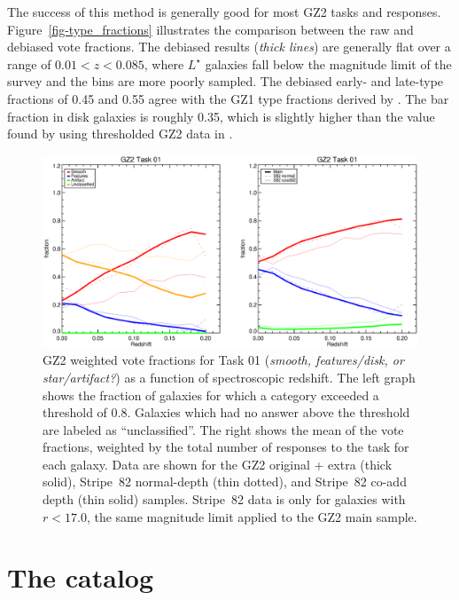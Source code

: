 \documentclass[useAMS,usenatbib]{mn2e}
\begin{document}
The success of this method is generally good for most GZ2 tasks and responses. Figure~\ref{fig-type_fractions} illustrates the comparison between the raw and debiased vote fractions. The debiased results ({\it thick lines}) are generally flat over a range of $0.01<z<0.085$, where $L^\star$ galaxies fall below the magnitude limit of the survey and the bins are more poorly sampled. The debiased early- and late-type fractions of 0.45 and 0.55 agree with the GZ1 type fractions derived by \citet{bam09}. The bar fraction in disk galaxies is roughly 0.35, which is slightly higher than the value found by using thresholded GZ2 data in \citet{mas11c}.

\begin{figure}
\includegraphics[angle=0,width=7.0in]{figures/gz2_bias_demo_task01.ps}
\caption{GZ2 weighted vote fractions for Task 01 ({\it smooth, features/disk, or star/artifact?}) as a function of spectroscopic redshift. The left graph shows the fraction of galaxies for which a category exceeded a threshold of 0.8. Galaxies which had no answer above the threshold are labeled as ``unclassified''. The right shows the mean of the vote fractions, weighted by the total number of responses to the task for each galaxy. Data are shown for the GZ2 original + extra (thick solid), Stripe~82 normal-depth (thin dotted), and Stripe~82 co-add depth (thin solid) samples. Stripe~82 data is only for galaxies with $r < 17.0$, the same magnitude limit applied to the GZ2 main sample.  
\label{fig-task01}}
\end{figure}


\section{The catalog} \label{sec-catalog}
\end{document}
